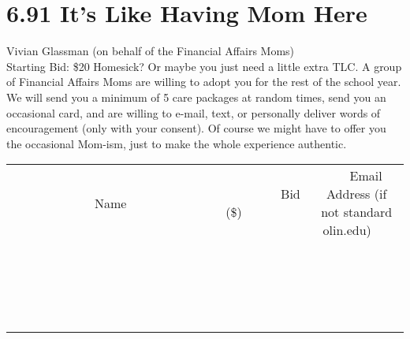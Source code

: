 \documentclass[11pt]{article}
\begin{document}
\section*{6.91 It’s Like Having Mom Here}
Vivian Glassman (on behalf of the Financial Affairs Moms)
\\
Starting Bid: \$20
\newline
Homesick?  Or maybe you just need a little extra TLC.  A group of Financial Affairs Moms are willing to adopt you for the rest of the school year.  We will send you a minimum of 5 care packages at random times, send you an occasional card, and are willing to e-mail, text, or personally deliver words of encouragement (only with your consent).  Of course we might have to offer you the occasional Mom-ism, just to make the whole experience authentic.
\\[3ex]
\begin{tabular}{c c c}
~~~~~~~~~~~~~Name~~~~~~~~~~~~~ & ~~~~~~~~~Bid (\$)~~~~~~~~~  & ~~~Email Address (if not standard olin.edu)~~~\\
 & & \\
\hline
 & & \\
\hline
 & & \\
\hline
 & & \\
\hline
 & & \\
\hline
 & & \\
\hline
 & & \\
\hline
 & & \\
\hline
 & & \\
\hline
 & & \\
\hline
 & & \\
\hline
 & & \\
\hline
 & & \\
\hline
 & & \\
\hline
 & & \\
\hline
 & & \\
\hline
 & & \\
\hline
 & & \\
\hline
 & & \\
\hline
\end{tabular}
\newpage
\end{document}

